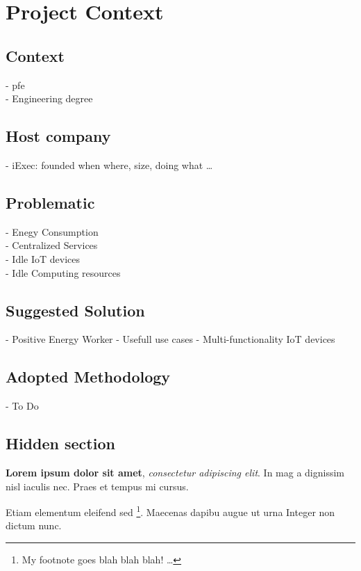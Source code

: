 
\chapter{Project Context}

\ifpdf
    \graphicspath{{2.0-Context/Figs/Raster/}{2.0-Context/Figs/PDF/}{2.0-Context/Figs/}}
\else
    \graphicspath{{2.0-Context/Figs/Vector/}{2.0-Context/Figs/}}
\fi

\section{Context}
- pfe \\
- Engineering degree

\section{Host company}
- iExec: founded when where, size, doing what \dots

\section{Problematic}
- Enegy Consumption \\
- Centralized Services \\
- Idle IoT devices \\
- Idle Computing resources 

\section{Suggested Solution}
- Positive Energy Worker
- Usefull use cases
- Multi-functionality IoT devices

\section{Adopted Methodology}
- To Do

\clearpage

\tochide\section{Hidden section}
\textbf{Lorem ipsum dolor sit amet}, \textit{consectetur adipiscing elit}. In mag a dignissim nisl iaculis nec. Praes et tempus mi cursus.

Etiam elementum eleifend sed \footnote{My footnote goes blah blah blah! \dots}. Maecenas dapibu augue ut urna Integer non dictum nunc.